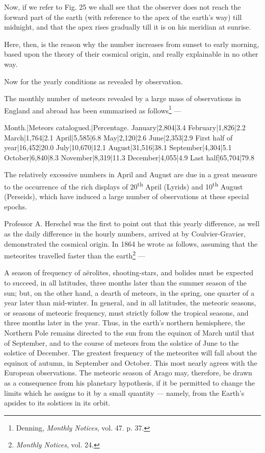 \documentclass[a4paper, 12pt, oneside, polutonikogreek, english]{article}
\begin{document}
Now, if we refer to Fig. 25 we shall see that the observer does not reach the forward part of the earth (with reference to the apex of the earth's way) till midnight, and that the apex rises gradually till it is on his meridian at sunrise.

Here, then, is the reason why the number increases from sunset to early morning, based upon the theory of their cosmical origin, and really explainable in no other way.

Now for the yearly conditions as revealed by observation.

The monthly number of meteors revealed by a large mass of observations in England and abroad has been summarised as follows\footnote{Denning, \emph{Monthly Notices}, vol. 47. p. 37.} ---

Month.|Meteors catalogued.|Percentage. 
January|2,804|3.4 
February|1,826|2.2 
March|1,764|2.1 
April|5,585|6.8 
May|2,120|2.6 
June|2,353|2.9 
First half of year|16,452|20.0 
July|10,670|12.1 
August|31,516|38.1 
September|4,304|5.1 
October|6,840|8.3 
November|8,319|11.3 
December|4,055|4.9 
Last half|65,704|79.8

The relatively excessive numbers in April and August are due in a great measure to the occurrence of the rich displays of 20\textsuperscript{th} April (Lyrids) and 10\textsuperscript{th} August (Perseids), which have induced a large number of observations at these special epochs.

Professor A. Herschel was the first to point out that this yearly difference, as well as the daily difference in the hourly numbers, arrived at by Coulvier-Gravier, demonstrated the cosmical origin. In 1864 he wrote as follows, assuming that the meteorites travelled faster than the earth\footnote{\emph{Monthly Notices}, vol. 24.} ---

A season of frequency of aërolites, shooting-stars, and bolides must be expected to succeed, in all latitudes, three months later than the summer season of the sun; but, on the other hand, a dearth of meteors, in the spring, one quarter of a year later than mid-winter. In general, and in all latitudes, the meteoric seasons, or seasons of meteoric frequency, must strictly follow the tropical seasons, and three months later in the year. Thus, in the earth's northern hemisphere, the Northern Pole remains directed to the sun from the equinox of March until that of September, and to the course of meteors from the solstice of June to the solstice of December. The greatest frequency of the meteorites will fall about the equinox of autumn, in September and October. This most nearly agrees with the European observations. The meteoric season of Arago may, therefore, be drawn as a consequence from his planetary hypothesis, if it be permitted to change the limits which he assigns to it by a small quantity --- namely, from the Earth's apsides to its solstices in its orbit.
\end{document}
